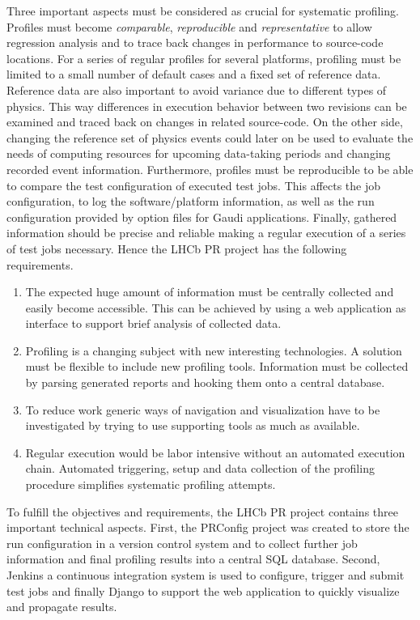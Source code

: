\documentclass[a4paper]{jpconf}
\begin{document}
Three important aspects must be considered as crucial for systematic profiling. Profiles must become \textit{comparable}, \textit{reproducible} and \textit{representative} to allow regression analysis and to trace back changes in performance to source-code locations. For a series of regular profiles for several platforms, profiling must be limited to a small number of default cases and a fixed set of reference data. Reference data are also important to avoid variance due to different types of physics. This way differences in execution behavior between two revisions can be examined and traced back on changes in related source-code. On the other side, changing the reference set of physics events could later on be used to evaluate the needs of computing resources for upcoming data-taking periods and changing recorded event information.
\newline
Furthermore, profiles must be reproducible to be able to compare the test configuration of executed test jobs. This affects the job configuration, to log the software/platform information, as well as the run configuration provided by option files for Gaudi applications. Finally, gathered information should be precise and reliable making a regular execution of a series of test jobs necessary.
\newline
Hence the LHCb PR project has the following requirements.
\begin{enumerate}
 \item The expected huge amount of information must be centrally collected and easily become accessible. This can be achieved by using a web application as interface to support brief analysis of collected data.
 \item Profiling is a changing subject with new interesting technologies. A solution must be flexible to include new profiling tools. Information must be collected by parsing generated reports and hooking them onto a central database.
 \item To reduce work generic ways of navigation and visualization have to be investigated by trying to use supporting tools as much as available.
 \item Regular execution would be labor intensive without an automated execution chain. Automated triggering, setup and data collection of the profiling procedure simplifies systematic profiling attempts.
\end{enumerate}
To fulfill the objectives and requirements, the LHCb PR project contains three important technical aspects. First, the PRConfig project was created to store the run configuration in a version control system and to collect further job information and final profiling results into a central SQL database. Second, Jenkins \cite{jenkins} a continuous integration system is used to configure, trigger and submit test jobs and finally Django \cite{django} to support the web application to quickly visualize and propagate results. 
\end{document}
